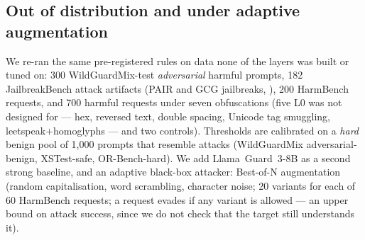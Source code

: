 \documentclass[11pt]{article}
\begin{document}
\subsection{Out of distribution and under adaptive augmentation}
We re-ran the same pre-registered rules on data none of the layers was built or tuned on: 300
WildGuardMix-test \emph{adversarial} harmful prompts, 182 JailbreakBench attack artifacts (PAIR and GCG
jailbreaks, \citealp{jbb}), 200 HarmBench requests, and 700 harmful requests
under seven obfuscations (five L0 was not designed for --- hex, reversed text, double spacing, Unicode tag
smuggling, leetspeak$+$homoglyphs --- and two controls). Thresholds are calibrated on a \emph{hard}
benign pool of 1{,}000 prompts that resemble attacks (WildGuardMix adversarial-benign, XSTest-safe,
OR-Bench-hard). We add Llama~Guard~3-8B as a second strong baseline, and an adaptive black-box attacker:
Best-of-N augmentation \citep{bon} (random capitalisation, word scrambling, character noise; 20 variants
for each of 60 HarmBench requests; a request evades if any variant is allowed --- an upper bound on attack
success, since we do not check that the target still understands it).
\end{document}
